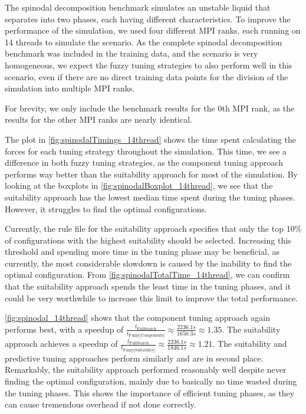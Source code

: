 The spinodal decomposition benchmark simulates an unstable liquid that separates into two phases, each having different characteristics. To improve the performance of the simulation, we used four different MPI ranks, each running on 14 threads to simulate the scenario. As the complete spinodal decomposition benchmark was included in the training data, and the scenario is very homogeneous, we expect the fuzzy tuning strategies to also perform well in this scenario, even if there are no direct training data points for the division of the simulation into multiple MPI ranks.

For brevity, we only include the benchmark results for the 0th MPI rank, as the results for the other MPI ranks are nearly identical.

The plot in \autoref{fig:spinodalTimings_14thread} shows the time spent calculating the forces for each tuning strategy throughout the simulation. This time, we see a difference in both fuzzy tuning strategies, as the component tuning approach performs way better than the suitability approach for most of the simulation. By looking at the boxplots in \autoref{fig:spinodalBoxplot_14thread}, we see that the suitability approach has the lowest median time spent during the tuning phases. However, it struggles to find the optimal configurations.

Currently, the rule file for the suitability approach specifies that only the top 10\% of configurations with the highest suitability should be selected. Increasing this threshold and spending more time in the tuning phase may be beneficial, as currently, the most considerable slowdown is caused by the inability to find the optimal configuration. From \autoref{fig:spinodalTotalTime_14thread}, we can confirm that the suitability approach spends the least time in the tuning phases, and it could be very worthwhile to increase this limit to improve the total performance.

\autoref{fig:spinodal_14thread} shows that the component tuning approach again performs best, with a speedup of $\frac{t_{\text{FullSearch}}}{t_{\text{Fuzzy[Components]}}} \approx \frac{2236.1s}{1650.3s} \approx 1.35$. The suitability approach achieves a speedup of $\frac{t_{\text{FullSearch}}}{t_{\text{Fuzzy[Suitability]}}} \approx \frac{2236.1s}{1846.1s} \approx 1.21$. The suitability and predictive tuning approaches perform similarly and are in second place. Remarkably, the suitability approach performed reasonably well despite never finding the optimal configuration, mainly due to basically no time wasted during the tuning phases. This shows the importance of efficient tuning phases, as they can cause tremendous overhead if not done correctly.

